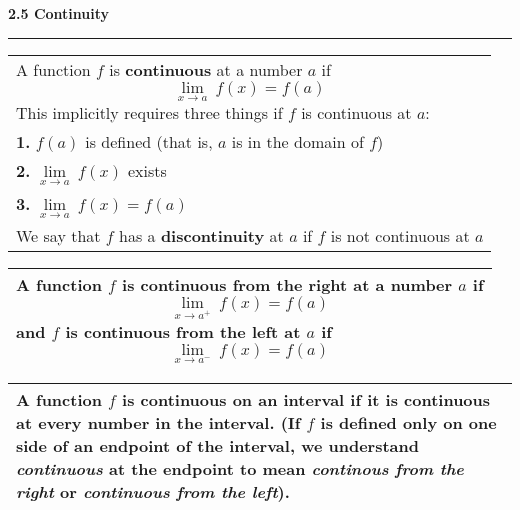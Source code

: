 \documentclass[fleqn]{article}
\begin{document}
\begin{center}
\Large\textbf{2.5 Continuity}

\noindent\hfill\rule{0.3\textwidth}{.4pt}\hfill
\vspace{12pt}

\large
\def\arraystretch{1.3}
{\setlength{\tabcolsep}{16pt}
\begin{tabularx}{.9\textwidth}{|X|}
\hline
	\vspace{1pt}
	A function $f$ is \textbf{continuous} at a number $a$ if
	$$\underset{x \to a}{\lim} \: f(x) = f(a)$$ 
	This implicitly requires three things if $f$ is continuous at $a$: \\
	\textbf{1. } $f(a)$ is defined (that is, $a$ is in the domain of $f$) \\
	\textbf{2. } $\underset{x \to a}{\lim} \: f(x)$ exists \\
	\textbf{3. } $\underset{x \to a}{\lim} \: f(x) = f(a)$ \\[12pt]
	We say that $f$ has a \textbf{discontinuity} at $a$ if $f$ is not continuous at $a$ \\[16pt]
\hline
\end{tabularx}}
\vspace{12pt}

\def\arraystretch{1.3}
{\setlength{\tabcolsep}{16pt}
\begin{tabularx}{.9\textwidth}{|X|}
\hline
	\vspace{1pt}
	A function $f$ is \textbf{continuous from the right} at a number $a$ if 
	$$\underset{x \to a^+}{\lim} \: f(x) = f(a)$$
	and $f$ is \textbf{continuous from the left} at $a$ if
	$$\underset{x \to a^-}{\lim} \: f(x) = f(a)$$ \\
\hline
\end{tabularx}}
\vspace{12pt}

\def\arraystretch{1.3}
{\setlength{\tabcolsep}{16pt}
\begin{tabularx}{.9\textwidth}{|X|}
\hline
	\vspace{1pt}
	A function $f$ is \textbf{continuous on an interval} if it is continuous at every  number in the interval. (If $f$ is defined only on one side of an endpoint of the interval, we understand \textit{continuous} at the endpoint to mean \textit{continous from the right} or \textit{continuous from the left}). \\[16pt]
\hline
\end{tabularx}}
\vspace{12pt}


\end{center}
\end{document}
